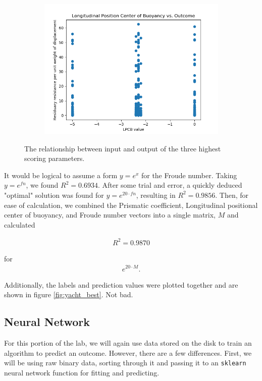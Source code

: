 \documentclass[11pt,a4paper]{article}
\begin{document}
\begin{figure}
\begin{subfigure}[h]{0.5\textwidth}
		\includegraphics[width=\textwidth]{lpcb}
		\caption{ }
		\label{fig:lpcb}
	\end{subfigure}
	\caption{The relationship between input and output of the three highest scoring parameters.}
	\label{fig:r2highest}
\end{figure}

It would be logical to assume a form $y = e^x$ for the Froude number. Taking $y = e^{fn}$, we found $R^2 = 0.6934$. After some trial and error, a quickly deduced "optimal" solution was found for $y = e^{20\cdot fn}$, resulting in $R^2 = 0.9856$. Then, for ease of calculation, we combined the Prismatic coefficient, Longitudinal positional center of buoyancy, and Froude number vectors into a single matrix, $M$ and calculated 

\begin{align*}
R^2 = 0.9870
\end{align*}

for
\begin{align*}
e^{20 \cdot M}.
\end{align*}

Additionally, the labels and prediction values were plotted together and are shown in figure \ref{fig:yacht_best}. Not bad.

\clearpage

\subsection{Neural Network}
For this portion of the lab, we will again use data stored on the disk to train an algorithm to predict an outcome. However, there are a few differences. First, we will be using raw binary data, sorting through it and passing it to an \verb|sklearn| neural network function for fitting and predicting. 
\end{document}
